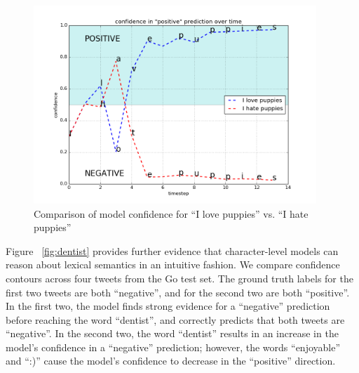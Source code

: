 \documentclass{article} %
\begin{document}
\begin{figure}[h!]

\begin{center}
\includegraphics[width=0.95\textwidth]{figs/puppies}
\end{center}
\caption{Comparison of model confidence for ``I love puppies'' vs. ``I hate puppies''}
\label{fig:puppies}
\end{figure}

Figure ~\ref{fig:dentist} provides further evidence that character-level models can reason about lexical semantics in an intuitive fashion. We compare confidence contours across four tweets from the Go test set. The ground truth labels for the first two tweets are both ``negative'', and for the second two are both ``positive''. In the first two, the model finds strong evidence for a ``negative'' prediction before reaching the word ``dentist'', and correctly predicts that both tweets are ``negative''. In the second two, the word ``dentist'' results in an increase in the model's confidence in a ``negative'' prediction; however, the words ``enjoyable'' and ``:)'' cause the model's confidence to decrease in the ``positive'' direction. 
\end{document}

